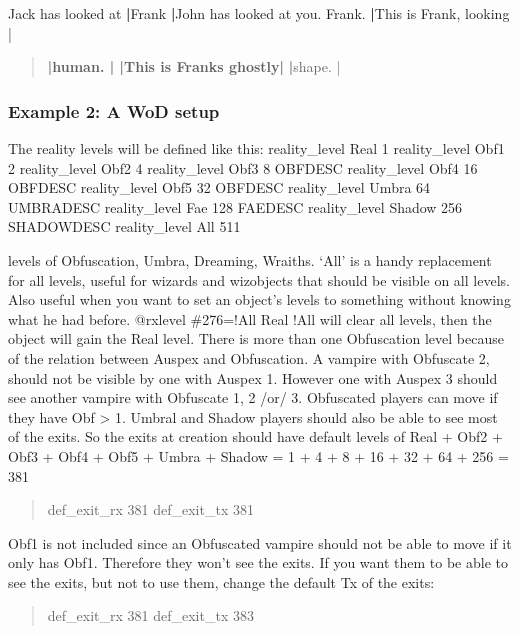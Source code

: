 \documentclass[letterpaper,10pt,english]{sphinxmanual}
\begin{document}
\sphinxAtStartPar
Jack has looked at      {\color{red}\bfseries{}|}Frank                  {\color{red}\bfseries{}|}John has looked at you.
Frank.                  {\color{red}\bfseries{}|}This is Frank, looking |
\begin{quote}

\sphinxAtStartPar
{\color{red}\bfseries{}|human.                 |
|This is Frank\textquotesingle{}s ghostly|}
{\color{red}\bfseries{}|}shape.                 |
\end{quote}


\subsubsection{Example 2: A WoD setup}
\label{\detokenize{advanced:example-2-a-wod-setup}}
\sphinxAtStartPar
The reality levels will be defined like this:
reality\_level           Real 1
reality\_level           Obf1 2
reality\_level           Obf2 4
reality\_level           Obf3 8 OBFDESC
reality\_level           Obf4 16 OBFDESC
reality\_level           Obf5 32 OBFDESC
reality\_level           Umbra 64 UMBRADESC
reality\_level           Fae 128 FAEDESC
reality\_level           Shadow 256 SHADOWDESC
reality\_level           All 511

 levels of Obfuscation, Umbra, Dreaming, Wraiths. ‘All’ is a handy
replacement for all levels, useful for wizards and wizobjects that should
be visible on all levels. Also useful when you want to set an object’s
levels to something without knowing what he had before.
@rxlevel \#276=!All Real
!All will clear all levels, then the object will gain the Real level.
There is more than one Obfuscation level because of the relation between
Auspex and Obfuscation.
A vampire with Obfuscate 2, should not be visible by one with Auspex 1.
However one with Auspex 3 should see another vampire with Obfuscate 1, 2
/or/ 3.
Obfuscated players can move if they have Obf \textgreater{} 1. Umbral and Shadow players
should also be able to see most of the exits. So the exits at creation
should have default levels of Real + Obf2 + Obf3 + Obf4 + Obf5 + Umbra +
Shadow = 1 + 4 + 8 + 16 + 32 + 64 + 256 = 381
\begin{quote}

\sphinxAtStartPar
def\_exit\_rx 381
def\_exit\_tx 381
\end{quote}

\sphinxAtStartPar
Obf1 is not included since an Obfuscated vampire should not be able to move
if it only has Obf1. Therefore they won’t see the exits. If you want them
to be able to see the exits, but not to use them, change the default Tx of
the exits:
\begin{quote}

\sphinxAtStartPar
def\_exit\_rx 381
def\_exit\_tx 383
\end{quote}
\end{document}
